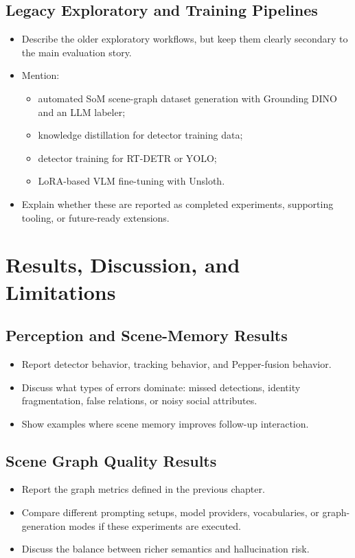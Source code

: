 \documentclass[
  digital,     %
  oneside,     %
  nosansbold,  %
  nocolorbold, %
  lof,         %
  lot,         %
]{fithesis4}
\begin{document}
\section{Legacy Exploratory and Training Pipelines}
\begin{itemize}
    \item Describe the older exploratory workflows, but keep them clearly secondary to the main evaluation story.
    \item Mention:
    \begin{itemize}
        \item automated SoM scene-graph dataset generation with Grounding DINO and an LLM labeler;
        \item knowledge distillation for detector training data;
        \item detector training for RT-DETR or YOLO;
        \item LoRA-based VLM fine-tuning with Unsloth.
    \end{itemize}
    \item Explain whether these are reported as completed experiments, supporting tooling, or future-ready extensions.
\end{itemize}

\chapter{Results, Discussion, and Limitations}

\section{Perception and Scene-Memory Results}
\begin{itemize}
    \item Report detector behavior, tracking behavior, and Pepper-fusion behavior.
    \item Discuss what types of errors dominate: missed detections, identity fragmentation, false relations, or noisy social attributes.
    \item Show examples where scene memory improves follow-up interaction.
\end{itemize}

\section{Scene Graph Quality Results}
\begin{itemize}
    \item Report the graph metrics defined in the previous chapter.
    \item Compare different prompting setups, model providers, vocabularies, or graph-generation modes if these experiments are executed.
    \item Discuss the balance between richer semantics and hallucination risk.
\end{itemize}
\end{document}
